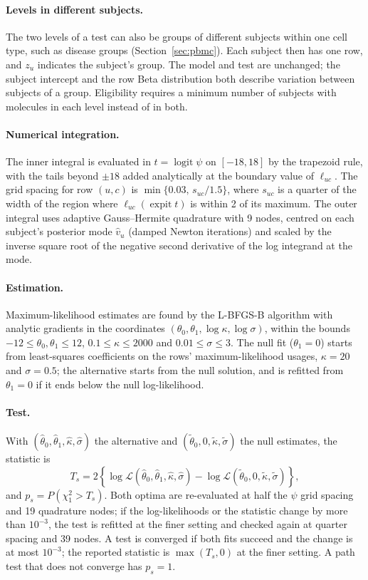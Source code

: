 \documentclass[11pt]{article}
\newcommand{\expit}{\operatorname{expit}}
\newcommand{\logit}{\operatorname{logit}}
\begin{document}
\paragraph{Levels in different subjects.} The two levels of a test can also be groups of different subjects within one cell type, such as disease groups (Section~\ref{sec:pbmc}). Each subject then has one row, and $z_u$ indicates the subject's group. The model and test are unchanged; the subject intercept and the row Beta distribution both describe variation between subjects of a group. Eligibility requires a minimum number of subjects with molecules in each level instead of in both.

\paragraph{Numerical integration.} The inner integral is evaluated in $t=\logit\psi$ on $[-18,18]$ by the trapezoid rule, with the tails beyond $\pm18$ added analytically at the boundary value of $\ell_{uc}$. The grid spacing for row $(u,c)$ is $\min\{0.03,\,s_{uc}/1.5\}$, where $s_{uc}$ is a quarter of the width of the region where $\ell_{uc}(\expit t)$ is within 2 of its maximum. The outer integral uses adaptive Gauss--Hermite quadrature with 9 nodes, centred on each subject's posterior mode $\widehat v_u$ (damped Newton iterations) and scaled by the inverse square root of the negative second derivative of the log integrand at the mode.

\paragraph{Estimation.} Maximum-likelihood estimates are found by the L-BFGS-B algorithm with analytic gradients in the coordinates $(\theta_0,\theta_1,\log\kappa,\log\sigma)$, within the bounds $-12\le\theta_0,\theta_1\le12$, $0.1\le\kappa\le2000$ and $0.01\le\sigma\le3$. The null fit ($\theta_1=0$) starts from least-squares coefficients on the rows' maximum-likelihood usages, $\kappa=20$ and $\sigma=0.5$; the alternative starts from the null solution, and is refitted from $\theta_1=0$ if it ends below the null log-likelihood.

\paragraph{Test.} With $(\widehat\theta_0,\widehat\theta_1,\widehat\kappa,\widehat\sigma)$ the alternative and $(\widetilde\theta_0,0,\widetilde\kappa,\widetilde\sigma)$ the null estimates, the statistic is \[T_s=2\left\{\log\mathcal L(\widehat\theta_0,\widehat\theta_1,\widehat\kappa,\widehat\sigma)-\log\mathcal L(\widetilde\theta_0,0,\widetilde\kappa,\widetilde\sigma)\right\},\] and $p_s=P(\chi^2_1>T_s)$. Both optima are re-evaluated at half the $\psi$ grid spacing and 19 quadrature nodes; if the log-likelihoods or the statistic change by more than $10^{-3}$, the test is refitted at the finer setting and checked again at quarter spacing and 39 nodes. A test is converged if both fits succeed and the change is at most $10^{-3}$; the reported statistic is $\max(T_s,0)$ at the finer setting. A path test that does not converge has $p_s=1$.
\end{document}
